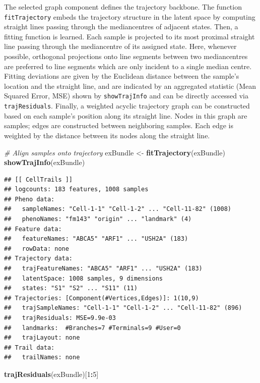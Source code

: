 \documentclass[]{book}
\newenvironment{Shaded}{\begin{snugshade}}{\end{snugshade}}
\newcommand{\KeywordTok}[1]{\textcolor[rgb]{0.13,0.29,0.53}{\textbf{#1}}}
\newcommand{\DecValTok}[1]{\textcolor[rgb]{0.00,0.00,0.81}{#1}}
\newcommand{\StringTok}[1]{\textcolor[rgb]{0.31,0.60,0.02}{#1}}
\newcommand{\CommentTok}[1]{\textcolor[rgb]{0.56,0.35,0.01}{\textit{#1}}}
\newcommand{\OperatorTok}[1]{\textcolor[rgb]{0.81,0.36,0.00}{\textbf{#1}}}
\newcommand{\NormalTok}[1]{#1}
\theoremstyle{definition}
\theoremstyle{definition}
\theoremstyle{definition}
\theoremstyle{remark}
\begin{document}
The selected graph component defines the trajectory backbone. The
function \texttt{fitTrajectory} embeds the trajectory structure in the
latent space by computing straight lines passing through the
mediancentres \citep{bedall1979} of adjacent states. Then, a fitting
function is learned. Each sample is projected to its most proximal
straight line passing through the mediancentre of its assigned state.
Here, whenever possible, orthogonal projections onto line segments
between two mediancentres are preferred to line segments which are only
incident to a single median centre. Fitting deviations are given by the
Euclidean distance between the sample's location and the straight line,
and are indicated by an aggregated statistic (Mean Squared Error, MSE)
shown by \texttt{showTrajInfo} and can be directly accessed via
\texttt{trajResiduals}. Finally, a weighted acyclic trajectory graph can
be constructed based on each sample's position along its straight line.
Nodes in this graph are samples; edges are constructed between
neighboring samples. Each edge is weighted by the distance between its
nodes along the straight line.

\begin{Shaded}
\begin{Highlighting}[]
\CommentTok{# Align samples onto trajectory}
\NormalTok{exBundle <-}\StringTok{ }\KeywordTok{fitTrajectory}\NormalTok{(exBundle)}
\KeywordTok{showTrajInfo}\NormalTok{(exBundle)}
\end{Highlighting}
\end{Shaded}

\begin{verbatim}
## [[ CellTrails ]] 
## logcounts: 183 features, 1008 samples
## Pheno data: 
##   sampleNames: "Cell-1-1" "Cell-1-2" ... "Cell-11-82" (1008)
##   phenoNames: "fm143" "origin" ... "landmark" (4)
## Feature data: 
##   featureNames: "ABCA5" "ARF1" ... "USH2A" (183)
##   rowData: none
## Trajectory data: 
##   trajFeatureNames: "ABCA5" "ARF1" ... "USH2A" (183)
##   latentSpace: 1008 samples, 9 dimensions
##   states: "S1" "S2" ... "S11" (11)
## Trajectories: [Component(#Vertices,Edges)]: 1(10,9)
##   trajSampleNames: "Cell-1-1" "Cell-1-2" ... "Cell-11-82" (896)
##   trajResiduals: MSE=9.9e-03
##   landmarks:  #Branches=7 #Terminals=9 #User=0
##   trajLayout: none
## Trail data: 
##   trailNames: none
\end{verbatim}

\begin{Shaded}
\begin{Highlighting}[]
\KeywordTok{trajResiduals}\NormalTok{(exBundle)[}\DecValTok{1}\OperatorTok{:}\DecValTok{5}\NormalTok{]}
\end{Highlighting}
\end{Shaded}
\end{document}
